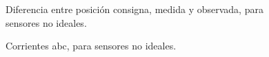 \documentclass[a4paper, 10pt, onecolumn,journal]{ieeeconf}
\begin{document}
\begin{figure}[H]
	\centering
	\begin{adjustbox}{scale=0.55,max width=\columnwidth}
	\end{adjustbox}
	\caption{Diferencia entre posición consigna, medida y observada, para sensores no ideales.}
	\label{Diferencia entre posición consigna,medida y observada, para sensores no ideales}
\end{figure}

\begin{figure}[H]
	\centering
	\begin{adjustbox}{scale=0.55,max width=\columnwidth}
	\end{adjustbox}
	\caption{Corrientes abc, para sensores no ideales.}
	\label{Corrientes abc, para sensores no ideales}
\end{figure}
\end{document}
